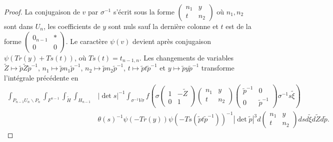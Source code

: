 \documentclass{amsart}
\begin{document}
\begin{proof}
La conjugaison de $v$ par $\sigma^{-1}$ s'écrit sous la forme $\begin{pmatrix}
n_1 & y \\
t & n_2
\end{pmatrix}$ où $n_1, n_2$ sont dans $U_n$, les coefficients de $y$ sont nuls sauf la dernière colonne et $t$ est de la forme $\begin{pmatrix}
0_{n-1} & * \\
0 & 0
\end{pmatrix}$. Le caractère $\psi(v)$ devient après conjugaison $\psi(Tr(y)+Ts(t))$, où $Ts(t) = t_{n-1,n}$. Les changements de variables $\tilde{Z} \mapsto \tilde{p}\tilde{Z}\tilde{p}^{-1}$, $n_1 \mapsto \tilde{p}n_1\tilde{p}^{-1}$, $n_2 \mapsto \tilde{p}n_2\tilde{p}^{-1}$,
$t \mapsto \tilde{p}t\tilde{p}^{-1}$ et $y \mapsto \tilde{p}y\tilde{p}^{-1}$ transforme l'intégrale précédente en
\begin{equation}
\begin{split}
\int_{P_{n-1}U_n\backslash{P_n}} \int_{F^{n-1}} \int_{\tilde{H}} \int_{H_{n-1}} & |\det s|^{-1}\int_{\sigma^{-1}V\sigma} f\left(\sigma \begin{pmatrix}
1 & -\tilde{Z} \\
0 & 1
\end{pmatrix}  \begin{pmatrix}
n_1 & y \\
t & n_2
\end{pmatrix} \begin{pmatrix}
\tilde{p}^{-1} & 0 \\
0 & \tilde{p}^{-1}
\end{pmatrix} \sigma^{-1} s \tilde{\xi}\right) \\
& \theta(s)^{-1} \psi(-Tr(y)) \psi(-Ts(\tilde{p}t\tilde{p}^{-1}))^{-1} |\det \tilde{p}|^3  d\begin{pmatrix}
n_1 & y \\
t & n_2
\end{pmatrix} ds d\tilde{\xi} d\tilde{Z} d\tilde{p}.
\end{split}
\end{equation}


\end{proof}
\end{document}
